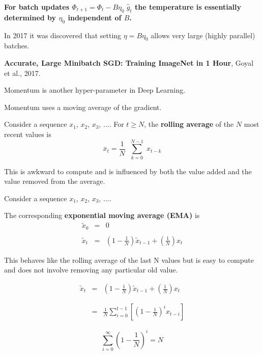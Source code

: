 {{\vfill
{\bf For batch updates $\Phi_{t+1} = \Phi_t - B\eta_0\; \hat{g}_t$ the temperature is essentially determined by $\eta_0$ independent of $B$.}
}


In 2017 it was discovered that setting $\eta = B\eta_0$ allows very large (highly parallel)
batches.

\vfill
{\bf Accurate, Large Minibatch SGD: Training ImageNet in 1 Hour}, Goyal et al., 2017.



Momentum is another hyper-parameter in Deep Learning.

\vfill
Momentum uses a moving average of the gradient.

\vfill
Consider a sequence $x_1$, $x_2$, $x_3$, $\ldots$.
\vfill
For $t \geq N$, the {\bf rolling average} of the $N$ most recent values is
$$\overline{x}_t = \frac{1}{N} \;\; \sum_{k = 0}^{N-1}\; x_{t-k}$$

\vfill
This is awkward to compute and is influenced by both the value added and the value removed from the average.


\vfill
Consider a sequence $x_1$, $x_2$, $x_3$, $\ldots$.

\vfill
The corresponding {\bf exponential moving average (EMA)} is
\begin{eqnarray*}
\tilde{x}_0 & = & 0 \\
\\
\tilde{x}_t & = & \left(1-\frac{1}{N}\right)\tilde{x}_{t-1} + \left(\frac{1}{N}\right)x_t
\end{eqnarray*}

\vfill
This behaves like the rolling average of the last N values but is easy to compute and does not involve removing any particular old value.

\begin{eqnarray*}
\tilde{x}_t & = & \left(1-\frac{1}{N}\right)\tilde{x}_{t-1} + \left(\frac{1}{N}\right)x_t \\
\\
\\
&= & \frac{1}{N}\sum_{i=0}^{t-1} \left[\left(1-\frac{1}{N}\right)^i x_{t-i}\right]
\end{eqnarray*}

\vfill
$$\sum_{i=0}^\infty \left(1-\frac{1}{N}\right)^i = N$$

}
